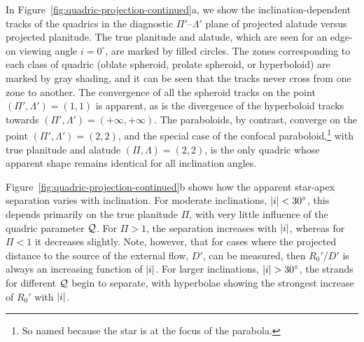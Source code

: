 In Figure~\ref{fig:quadric-projection-continued}a, we show the
inclination-dependent tracks of the quadrics in the diagnostic
\(\Pi'\)--\(\Lambda'\) plane of projected alatude versus projected planitude.
The true planitude and alatude, which are seen for an edge-on viewing
angle \(i = 0^\circ\), are marked by filled circles.  The zones
corresponding to each class of quadric (oblate spheroid, prolate
spheroid, or hyperboloid) are marked by gray shading, and it can be
seen that the tracks never cross from one zone to another. The
convergence of all the spheroid tracks on the point
\((\Pi', \Lambda') = (1, 1)\) is apparent, as is the divergence of the
hyperboloid tracks towards \((\Pi', \Lambda') = (+\infty, +\infty)\).  The paraboloids,
by contrast, converge on the point \((\Pi', \Lambda') = (2, 2)\), and the
special case of the confocal paraboloid,\footnote{So named because the
  star is at the focus of the parabola.} with true planitude and
alatude \((\Pi, \Lambda) = (2, 2)\), is the only quadric whose apparent shape
remains identical for all inclination angles.  

Figure~\ref{fig:quadric-projection-continued}b shows how the apparent
star-apex separation varies with inclination.  For moderate
inclinations, \(\lvert i\rvert < 30^\circ\), this depends primarily on the true
planitude \(\Pi\), with very little influence of the quadric parameter
\(\mathcal{Q}\).  For \(\Pi > 1\), the separation increases with \(\lvert i\rvert\), whereas
for \(\Pi < 1\) it decreases slightly.  Note, however, that for cases
where the projected distance to the source of the external flow,
\(D'\), can be measured, then \(R_0'/D'\) is always an increasing
function of \(\lvert i\rvert\).  For larger inclinations, \(\lvert i\rvert > 30^\circ\), the
strands for different \(\mathcal{Q}\) begin to separate, with hyperbolae
showing the strongest increase of \(R_0'\) with \(\lvert i\rvert\).

